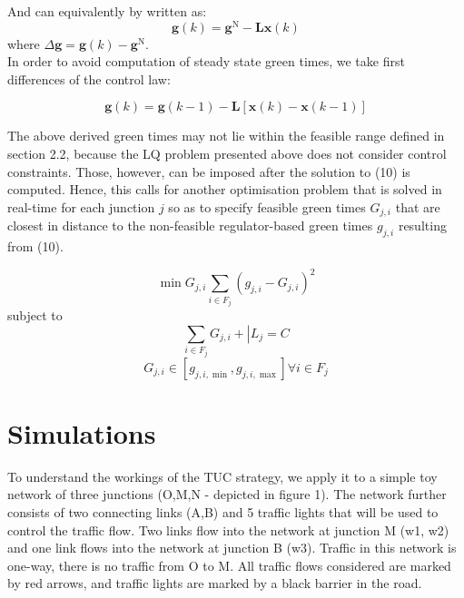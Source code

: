 \documentclass[11pt]{article}
\begin{document}
And can equivalently by written as:
\begin{equation} 
\mathbf { g } ( k ) = \mathbf { g } ^ { \mathrm { N } } - \mathbf { L } \mathbf { x } ( k )
\end{equation}
where $\Delta \mathbf {g } = \mathbf { g } ( k ) - \mathbf {g } ^ { \mathrm { N } }$.\\

In order to avoid computation of steady state green times, we take first differences of the control law:

\begin{equation} 
\mathbf { g } ( k ) = \mathbf { g } (k-1)  - \mathbf { L } [ \mathbf { x } ( k ) - \mathbf { x } ( k -1 )]
\end{equation}

The above derived green times may not lie within the feasible range defined in section 2.2, because the LQ problem presented above does not consider control constraints. Those, however, can be imposed after the solution to (10) is computed. Hence, this calls for another optimisation problem that is solved in real-time for each junction $j$ so as to specify feasible green times $G _ { j , i }$ that are closest in distance to the non-feasible regulator-based green times $g _ { j , i }$ resulting from (10).

\begin{equation} \operatorname { min } { G _ { j , i } } \sum _ { i \in F _ { j } } \left( g _ { j , i } - G _ { j , i } \right) ^ { 2 }\end{equation} 
subject to
\begin{equation} 
\sum _ { i \in F _ { j } } G _ { j , i } + \left| L _ { j } = C \right.
\end{equation} 
\begin{equation} 
G _ { j , i } \in \left[ g _ { j , i , \min } , g _ { j , i , \max } \right] \forall i \in F _ { j }
\end{equation} 

\section{Simulations}
To understand the workings of the TUC strategy, we apply it to a simple toy network of three junctions (O,M,N - depicted in figure 1). The network further consists of two connecting links (A,B) and 5 traffic lights that will be used to control the traffic flow. Two links flow into the network at junction M (w1, w2) and one link flows into the network at junction B (w3). Traffic in this network is one-way, there is no traffic from O to M. All traffic flows considered are marked by red arrows, and traffic lights are marked by a black barrier in the road. 
\end{document}
